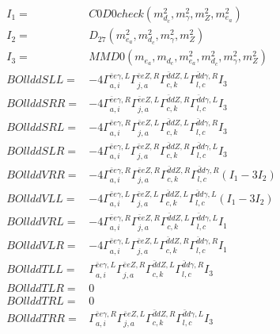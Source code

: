 \documentclass[A4,landscape]{article}
\begin{document}
\begin{align} 
I_1 = & C0D0check(m^2_{d_{{c}}}, m^2_{\gamma}, m^2_{Z}, m^2_{e_{{a}}}) \\ 
I_2 = & D_{27}(m^2_{e_{{a}}}, m^2_{d_{{c}}}, m^2_{\gamma}, m^2_{Z}) \\ 
I_3 = & MMD0(m_{e_{{a}}}, m_{d_{{c}}}, m^2_{e_{{a}}}, m^2_{d_{{c}}}, m^2_{\gamma}, m^2_{Z}) \\ 
  BOllddSLL= & -4  \Gamma^{\bar{e}e \gamma ,L}_{a, i} \Gamma^{\bar{e}e Z ,R}_{j, a} \Gamma^{\bar{d}d Z ,L}_{c, k} \Gamma^{\bar{d}d \gamma ,R}_{l, c} I_3 \\ 
  BOllddSRR= & -4  \Gamma^{\bar{e}e \gamma ,R}_{a, i} \Gamma^{\bar{e}e Z ,L}_{j, a} \Gamma^{\bar{d}d Z ,R}_{c, k} \Gamma^{\bar{d}d \gamma ,L}_{l, c} I_3 \\ 
  BOllddSRL= & -4  \Gamma^{\bar{e}e \gamma ,R}_{a, i} \Gamma^{\bar{e}e Z ,L}_{j, a} \Gamma^{\bar{d}d Z ,L}_{c, k} \Gamma^{\bar{d}d \gamma ,R}_{l, c} I_3 \\ 
  BOllddSLR= & -4  \Gamma^{\bar{e}e \gamma ,L}_{a, i} \Gamma^{\bar{e}e Z ,R}_{j, a} \Gamma^{\bar{d}d Z ,R}_{c, k} \Gamma^{\bar{d}d \gamma ,L}_{l, c} I_3 \\ 
  BOllddVRR= & -4  \Gamma^{\bar{e}e \gamma ,R}_{a, i} \Gamma^{\bar{e}e Z ,R}_{j, a} \Gamma^{\bar{d}d Z ,R}_{c, k} \Gamma^{\bar{d}d \gamma ,R}_{l, c} (I_1 - 3 I_2) \\ 
  BOllddVLL= & -4  \Gamma^{\bar{e}e \gamma ,L}_{a, i} \Gamma^{\bar{e}e Z ,L}_{j, a} \Gamma^{\bar{d}d Z ,L}_{c, k} \Gamma^{\bar{d}d \gamma ,L}_{l, c} (I_1 - 3 I_2) \\ 
  BOllddVRL= & -4  \Gamma^{\bar{e}e \gamma ,R}_{a, i} \Gamma^{\bar{e}e Z ,R}_{j, a} \Gamma^{\bar{d}d Z ,L}_{c, k} \Gamma^{\bar{d}d \gamma ,L}_{l, c} I_1 \\ 
  BOllddVLR= & -4  \Gamma^{\bar{e}e \gamma ,L}_{a, i} \Gamma^{\bar{e}e Z ,L}_{j, a} \Gamma^{\bar{d}d Z ,R}_{c, k} \Gamma^{\bar{d}d \gamma ,R}_{l, c} I_1 \\ 
  BOllddTLL= &  \Gamma^{\bar{e}e \gamma ,L}_{a, i} \Gamma^{\bar{e}e Z ,R}_{j, a} \Gamma^{\bar{d}d Z ,L}_{c, k} \Gamma^{\bar{d}d \gamma ,R}_{l, c} I_3 \\ 
  BOllddTLR= & 0 \\ 
  BOllddTRL= & 0 \\ 
  BOllddTRR= &  \Gamma^{\bar{e}e \gamma ,R}_{a, i} \Gamma^{\bar{e}e Z ,L}_{j, a} \Gamma^{\bar{d}d Z ,R}_{c, k} \Gamma^{\bar{d}d \gamma ,L}_{l, c} I_3 \\ 
\end{align} 
\end{document}
